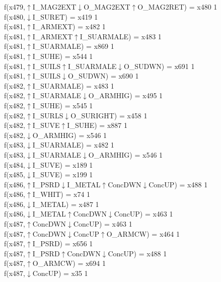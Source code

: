 f(x479,$\uparrow$I\_MAG2EXT$\downarrow$O\_MAG2EXT$\uparrow$O\_MAG2RET) = x480 {1} \\
f(x480,$\downarrow$I\_SURET) = x419 {1} \\
f(x481,$\uparrow$I\_ARMEXT) = x482 {1} \\
f(x481,$\uparrow$I\_ARMEXT$\uparrow$I\_SUARMALE) = x483 {1} \\
f(x481,$\uparrow$I\_SUARMALE) = x869 {1} \\
f(x481,$\uparrow$I\_SUHE) = x544 {1} \\
f(x481,$\uparrow$I\_SUILS$\uparrow$I\_SUARMALE$\downarrow$O\_SUDWN) = x691 {1} \\
f(x481,$\uparrow$I\_SUILS$\downarrow$O\_SUDWN) = x690 {1} \\
f(x482,$\uparrow$I\_SUARMALE) = x483 {1} \\
f(x482,$\uparrow$I\_SUARMALE$\downarrow$O\_ARMHIG) = x495 {1} \\
f(x482,$\uparrow$I\_SUHE) = x545 {1} \\
f(x482,$\uparrow$I\_SURLS$\downarrow$O\_SURIGHT) = x458 {1} \\
f(x482,$\uparrow$I\_SUVE$\uparrow$I\_SUHE) = x887 {1} \\
f(x482,$\downarrow$O\_ARMHIG) = x546 {1} \\
f(x483,$\downarrow$I\_SUARMALE) = x482 {1} \\
f(x483,$\downarrow$I\_SUARMALE$\downarrow$O\_ARMHIG) = x546 {1} \\
f(x484,$\downarrow$I\_SUVE) = x189 {1} \\
f(x485,$\downarrow$I\_SUVE) = x199 {1} \\
f(x486,$\uparrow$I\_PSRD$\downarrow$I\_METAL$\uparrow$ConcDWN$\downarrow$ConcUP) = x488 {1} \\
f(x486,$\uparrow$I\_WHIT) = x74 {1} \\
f(x486,$\downarrow$I\_METAL) = x487 {1} \\
f(x486,$\downarrow$I\_METAL$\uparrow$ConcDWN$\downarrow$ConcUP) = x463 {1} \\
f(x487,$\uparrow$ConcDWN$\downarrow$ConcUP) = x463 {1} \\
f(x487,$\uparrow$ConcDWN$\downarrow$ConcUP$\uparrow$O\_ARMCW) = x464 {1} \\
f(x487,$\uparrow$I\_PSRD) = x656 {1} \\
f(x487,$\uparrow$I\_PSRD$\uparrow$ConcDWN$\downarrow$ConcUP) = x488 {1} \\
f(x487,$\uparrow$O\_ARMCW) = x694 {1} \\
f(x487,$\downarrow$ConcUP) = x35 {1} \\
